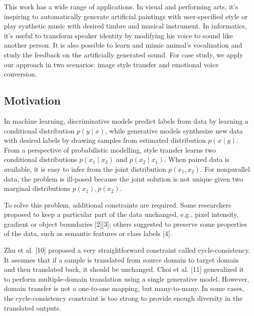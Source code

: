 \documentclass{article}
\begin{document}
This work has a wide range of applications. In visual and performing arts, it's inspiring to automatically generate artificial paintings with user-specified style or play synthetic music with desired timbre and musical instrument. In informatics, it's useful to transform speaker identity by modifying his voice to sound like another person. It is also possible to learn and mimic animal's vocalization and study the feedback on the artificially generated sound. For case study, we apply our approach in two scenarios: image style transfer and emotional voice conversion.

\subsection{Motivation} %
In machine learning, discriminative models predict labels from data by learning a conditional distribution $p(y\mid x)$, while generative models {\color{blue} synthesize} new data with desired labels by drawing samples from estimated distribution $p(x\mid y)$. From a perspective of probabilistic modelling, style transfer learns two conditional distributions $p(x_1\mid x_2)$ and $p(x_2\mid x_1)$. When paired data is available, it is easy to infer from the joint distribution $p(x_1,x_2)$. For nonparallel data, the problem is ill-posed because the joint solution is not unique given two marginal distributions $p(x_1), p(x_2)$.

To solve this problem, additional constraints are required. Some researchers proposed to keep a particular part of the data unchanged, e.g., pixel intensity, gradient or object boundaries [2][3]; others suggested to preserve some properties of the data, such as semantic features or class labels [4].

Zhu et al. [10] proposed a very straightforward constraint called cycle-consistency. It assumes that if a sample is translated from source domain to target domain and then translated back, it should be unchanged. Choi et al. [11] generalized it to perform multiple-domain translation using a single generative model. However, domain transfer is not a one-to-one mapping, but many-to-many. In some cases, the cycle-consistency constraint is too strong to provide enough diversity in the translated outputs.
\end{document}
